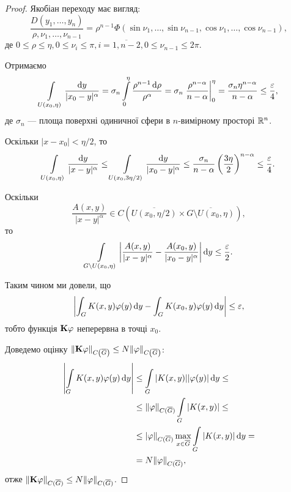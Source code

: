 \begin{proof}
	Якобіан переходу має вигляд:
	\begin{equation}
		\dfrac{D(y_1, \ldots, y_n)}{\rho, \nu_1, \ldots, \nu_{n - 1}} = \rho^{n - 1} \Phi(\sin \nu_1, \ldots, \sin \nu_{n - 1}, \cos \nu_1, \ldots, \cos \nu_{n - 1}),
	\end{equation}
	де $0 \le \rho \le \eta, 0 \le \nu_i \le \pi, i = \overline{1, n - 2}, 0 \le \nu_{n - 1} \le 2 \pi$. \medskip

	Отримаємо 
	\begin{equation}
		\Int_{U(x_0, \eta)} \dfrac{\diff y}{|x_0 - y|^\alpha} = \sigma_n \Int_0^\eta \dfrac{\rho^{n - 1} \diff \rho}{\rho^\alpha} = \sigma_n \left.\dfrac{\rho^{n - \alpha}}{n - \alpha}\right|_0^\eta = \dfrac{\sigma_n \eta^{n - \alpha}}{n - \alpha} \le \dfrac{\epsilon}{4},
	\end{equation}
	де $\sigma_n$ --- площа поверхні одиничної сфери в $n$-вимірному просторі $\RR^n$. \medskip

	Оскільки $|x - x_0| < \eta / 2$, то 
	\begin{equation}
		\Int_{U(x_0, \eta)} \dfrac{\diff y}{|x - y|^\alpha} \le \Int_{U(x_0, 3\eta/2)} \dfrac{\diff y}{|x_0 - y|^\alpha} \le \dfrac{\sigma_n}{n - \alpha} \left(\dfrac{3\eta}{2}\right)^{n - \alpha} \le \dfrac{\epsilon}{4}.
	\end{equation}

	Оскільки 
	\begin{equation}
		\frac{A(x, y)}{|x - y|^\alpha} \in C\left(\overline{U (x_0, \eta/2)}\times\overline{G \setminus U (x_0, \eta)}\right),
	\end{equation}
	то
	\begin{equation}
		\Int_{G \setminus U(x_0, \eta)} \left|\dfrac{A(x, y)}{|x - y|^\alpha} - \dfrac{A(x_0, y)}{|x_0 - y|^\alpha}\right| \diff y \le \dfrac{\epsilon}{2}.
	\end{equation}

	Таким чином ми довели, що 
	\begin{equation}
		\left| \int_G K(x, y) \phi(y) \diff y - \int_G K(x_0, y) \phi(y) \diff y \right| \le \epsilon,
	\end{equation}
	тобто функція $\bf{K}\phi$ неперервна в точці $x_0$. \medskip

	Доведемо оцінку $\|\bf{K}\phi\|_{C\left(\overline G\right)} \le N \|\phi\|_{C\left(\overline G\right)}$:
	\begin{equation}
		\begin{aligned}
			\left| \Int_G K(x, y) \phi(y) \diff y \right| &\le \Int_G |K(x, y)| |\phi(y)| \diff y \le \\
			&\le \|\phi\|_{C(\overline G)} \Int_G |K(x, y)| \le \\
			&\le |\phi\|_{C(\overline G)} \Max_{x \in \overline G} \Int_G |K(x, y)| \diff y = \\
			&= N \|\phi\|_{C(\overline G)},
		\end{aligned}
	\end{equation}
	отже $\| \bf{K}\phi \|_{C(\overline G)} \le N \|\phi\|_{C(\overline G)}$. \medskip


\end{proof}
